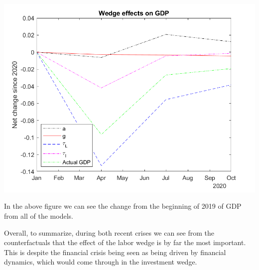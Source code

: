 \documentclass[11pt]{article} %
\begin{document}
\includegraphics{wedgescovdiff}

In the above figure we can see the change from the beginning of 2019 of GDP from all of the models. 

Overall, to summarize, during both recent crises we can see from the counterfactuals that the effect of the labor wedge is by far the most important. This is despite the financial crisis being seen as being driven by financial dynamics, which would come through in the investment wedge. 
\end{document}
